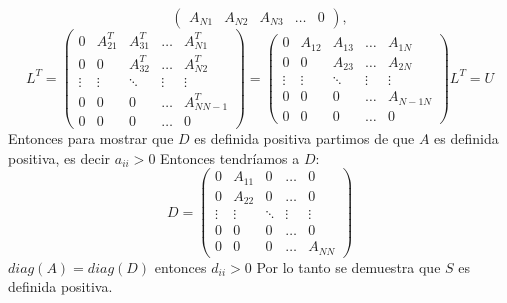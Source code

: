\begin{itemize}
$$\begin{pmatrix}
      A_{N 1} &  A_{N 2}      & A_{N 3}      & \ldots &  0 
    \end{pmatrix},
$$
$$
    L^T=\begin{pmatrix}
      0 &  A_{21}^T & A_{31}^T & \ldots &  A_{N1}^T \\
      0 &  0      & A_{32}^T & \ldots &  A_{N2}^T \\
      \vdots & \vdots  & \ddots & \vdots & \vdots \\
      0 &  0      & 0      & \ldots &  A_{N N-1 }^T \\
      0 &  0      & 0      & \ldots &  0 
    \end{pmatrix}
    =\begin{pmatrix}
      0 &  A_{12} & A_{13} & \ldots &  A_{1N} \\
      0 &  0      & A_{23} & \ldots &  A_{2N} \\
      \vdots & \vdots  & \ddots & \vdots & \vdots \\
      0 &  0      & 0      & \ldots &  A_{N-1 N} \\
      0 &  0      & 0      & \ldots &  0 
    \end{pmatrix} L^T =U
$$
Entonces para mostrar que $D$  es definida positiva partimos de que $A$ es definida positiva, es decir $a_{ii}>0$
Entonces tendríamos a $D$:
$$
    D=\begin{pmatrix}
      0 &  A_{11} & 0 & \ldots &  0 \\
      0 &  A_{22} & 0 & \ldots &  0 \\
      \vdots & \vdots  & \ddots & \vdots & \vdots \\
      0 &  0      & 0      & \ldots &  0 \\
      0 &  0      & 0      & \ldots &  A_{N N} 
    \end{pmatrix}
$$
$diag(A) = diag(D)$ entonces $d_{ii}>0$
Por lo tanto se demuestra que $S$ es definida positiva.


\end{itemize}
